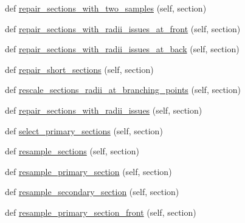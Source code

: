 \begin{DoxyCompactItemize}
\item 
def \hyperlink{classmeshy_1_1neuromorphovis_1_1morphologies_1_1morphology__analyzer_1_1MorphologyAnalyzer_a18264f4b35a274e678d9079472771447}{repair\+\_\+sections\+\_\+with\+\_\+two\+\_\+samples} (self, section)
\item 
def \hyperlink{classmeshy_1_1neuromorphovis_1_1morphologies_1_1morphology__analyzer_1_1MorphologyAnalyzer_a928956d3319794db6c2fc1bd759f3b08}{repair\+\_\+sections\+\_\+with\+\_\+radii\+\_\+issues\+\_\+at\+\_\+front} (self, section)
\item 
def \hyperlink{classmeshy_1_1neuromorphovis_1_1morphologies_1_1morphology__analyzer_1_1MorphologyAnalyzer_a4c7914ad197d8d1a02d815466fa3879f}{repair\+\_\+sections\+\_\+with\+\_\+radii\+\_\+issues\+\_\+at\+\_\+back} (self, section)
\item 
def \hyperlink{classmeshy_1_1neuromorphovis_1_1morphologies_1_1morphology__analyzer_1_1MorphologyAnalyzer_a766f4048056a75a34e6acbfb7c18578f}{repair\+\_\+short\+\_\+sections} (self, section)
\item 
def \hyperlink{classmeshy_1_1neuromorphovis_1_1morphologies_1_1morphology__analyzer_1_1MorphologyAnalyzer_a357e11ff2fe469bb42c303a23142b0fa}{rescale\+\_\+sections\+\_\+radii\+\_\+at\+\_\+branching\+\_\+points} (self, section)
\item 
def \hyperlink{classmeshy_1_1neuromorphovis_1_1morphologies_1_1morphology__analyzer_1_1MorphologyAnalyzer_abd38c78c5927407e51376c176115a75d}{repair\+\_\+sections\+\_\+with\+\_\+radii\+\_\+issues} (self, section)
\item 
def \hyperlink{classmeshy_1_1neuromorphovis_1_1morphologies_1_1morphology__analyzer_1_1MorphologyAnalyzer_a0900415d71a38afcc019c7c947462b0d}{select\+\_\+primary\+\_\+sections} (self, section)
\item 
def \hyperlink{classmeshy_1_1neuromorphovis_1_1morphologies_1_1morphology__analyzer_1_1MorphologyAnalyzer_a7365de4c5cb081c63b331455661acdc3}{resample\+\_\+sections} (self, section)
\item 
def \hyperlink{classmeshy_1_1neuromorphovis_1_1morphologies_1_1morphology__analyzer_1_1MorphologyAnalyzer_aeafe1ccd7098df3ca2a7864691c1d129}{resample\+\_\+primary\+\_\+section} (self, section)
\item 
def \hyperlink{classmeshy_1_1neuromorphovis_1_1morphologies_1_1morphology__analyzer_1_1MorphologyAnalyzer_a490b6dcfb91492a49850211ff5db5e57}{resample\+\_\+secondary\+\_\+section} (self, section)
\item 
def \hyperlink{classmeshy_1_1neuromorphovis_1_1morphologies_1_1morphology__analyzer_1_1MorphologyAnalyzer_ac5a0cd3bc8ae999a93d17bf0577c906a}{resample\+\_\+primary\+\_\+section\+\_\+front} (self, section)

\end{DoxyCompactItemize}
